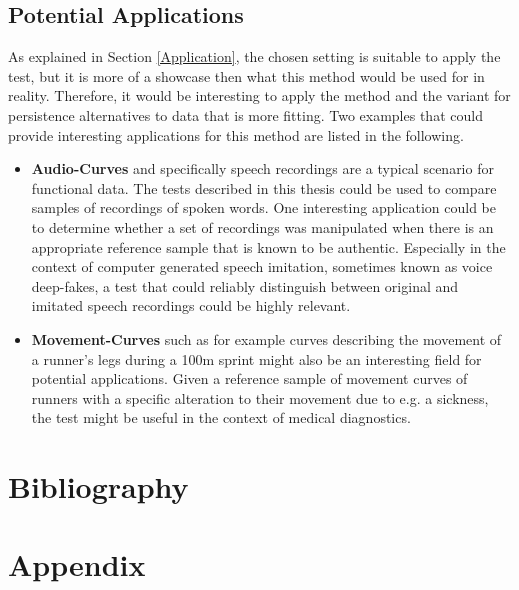 \documentclass[12pt, a4paper]{article}
\theoremstyle{MAstyle} \newtheorem{assumption}{Assumption}[section]
\theoremstyle{MAstyle} \newtheorem{definition}{Definition}[section]
\theoremstyle{MAstyle} \newtheorem{theorem}{Theorem}[section]
\begin{document}
		\subsection{Potential Applications}
			As explained in Section \ref{Application}, the chosen setting is suitable to apply the test, but it is more of a showcase then what this method would be used for in reality. Therefore, it would be interesting to apply the method and the variant for persistence alternatives to data that is more fitting. Two examples that could provide interesting applications for this method are listed in the following.
			\begin{itemize}
				\item \textbf{Audio-Curves} and specifically speech recordings are a typical scenario for functional data. The tests described in this thesis could be used to compare samples of recordings of spoken words. One interesting application could be to determine whether a set of recordings was manipulated when there is an appropriate reference sample that is known to be authentic. Especially in the context of computer generated speech imitation, sometimes known as voice deep-fakes, a test that could reliably distinguish between original and imitated speech recordings could be highly relevant.
				\item \textbf{Movement-Curves} such as for example curves describing the movement of a runner's legs during a 100m sprint might also be an interesting field for potential applications. Given a reference sample of movement curves of runners with a specific alteration to their movement due to e.g. a sickness, the test might be useful in the context of medical diagnostics.
			\end{itemize}
		
		
	
	\newpage
	\section{Bibliography}
	\printbibliography[heading=none]
	
	\newpage
	\cleardoublepage
	\setcounter{page}{1}
	\section{Appendix}
	
\end{document}
